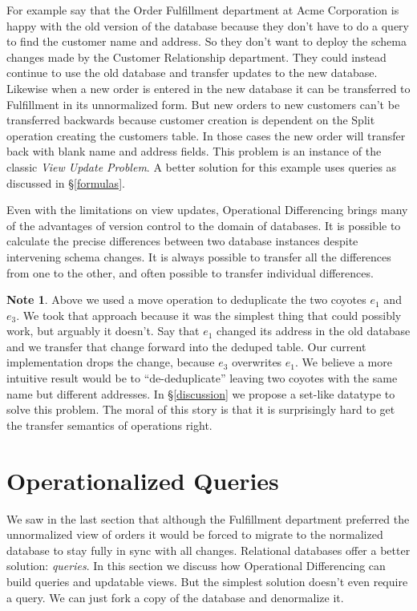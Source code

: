\documentclass[english,submission]{programming}
\theoremstyle{definition}
\newtheorem*{note}{Note}
\newcommand{\mathbox}[1]{\colorbox{black!10}{$#1$\phantom{i\hspace{-3.5pt}}}}
\begin{document}
For example say that the Order Fulfillment department at Acme Corporation is happy with the old version of the database because they don't have to do a query to find the customer name and address. So they don't want to deploy the schema changes made by the Customer Relationship department. They could instead continue to use the old database and transfer updates to the new database. Likewise when a new order is entered in the new database it can be transferred to Fulfillment in its unnormalized form. But new orders to new customers can't be transferred backwards because customer creation is dependent on the \textsf{Split} operation creating the customers table. In those cases the new order will transfer back with blank name and address fields. This problem is an instance of the classic \textit{View Update Problem}\cite{Bancilhon81, Foster2007}. A better solution for this example uses queries as discussed in \S\ref{formulas}.

Even with the limitations on view updates, Operational Differencing brings many of the advantages of version control to the domain of databases. It is possible to calculate the precise differences between two database instances despite intervening schema changes. It is always possible to transfer all the differences from one to the other, and often possible to transfer individual differences.

\begin{note}
Above we used a \textsf{move} operation to deduplicate the two coyotes \mathbox{e_1} and \mathbox{e_3}. We took that approach because it was the simplest thing that could possibly work, but arguably it doesn't. Say that \mathbox{e_1} changed its address in the old database and we transfer that change forward into the deduped table. Our current implementation drops the change, because \mathbox{e_3} overwrites \mathbox{e_1}. We believe a more intuitive result would be to ``de-deduplicate''
leaving two coyotes with the same name but different addresses.
In \S\ref{discussion} we propose a set-like datatype to solve this problem.
The moral of this story is that it is surprisingly hard to get the transfer semantics of operations right.
\end{note}


\section{Operationalized Queries}

We saw in the last section that although the Fulfillment department preferred the unnormalized view of orders it would be forced to migrate to the normalized database to stay fully in sync with all changes. Relational databases offer a better solution: \textit{queries}. In this section we discuss how Operational Differencing can build queries and updatable views. But the simplest solution doesn't even require a query. We can just fork a copy of the database and denormalize it.
\end{document}
